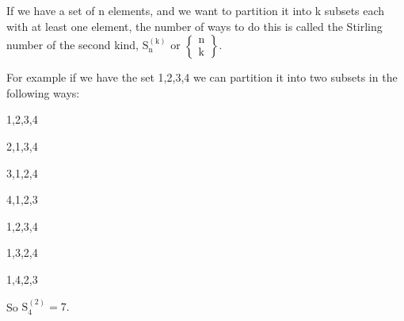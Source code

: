 If we have a set of n elements, and we want to partition it into
k subsets each with at least one element, the number of ways to do this
is called the Stirling number of the second kind, 
$ \mathrm{S}_{\mathrm{n}} ^{( \mathrm{k} ) } $ or 
$ \left \{ 
\begin{array}{c} 
  \mathrm{n} \\
  \mathrm{k}
\end{array} 
\right \} . $
\par
For example if we have the set {1,2,3,4} we can partition it into 
two subsets in the following ways:
\par
{{1},{2,3,4}}
\par
{{2},{1,3,4}}
\par
{{3},{1,2,4}}
\par
{{4},{1,2,3}}
\par
{{1,2},{3,4}}
\par
{{1,3},{2,4}}
\par
{{1,4},{2,3}}
\par
So $ \mathrm{S}_4 ^{(2)} = 7 . $